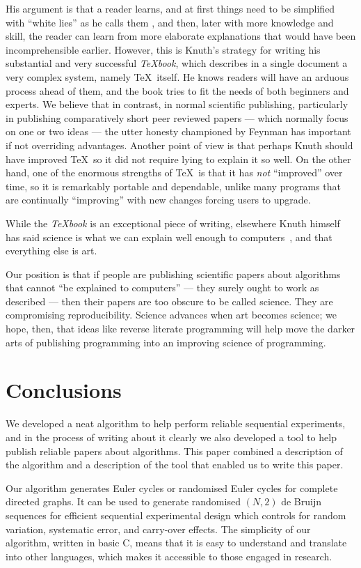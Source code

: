 \documentclass[12pt]{article}
\begin{document}
His argument is that a reader learns, and at first things need to be simplified with ``white lies'' as he calls them \cite[p44]{texbook}, and then, later with more knowledge and skill, the reader can learn from more elaborate explanations that would have been incomprehensible earlier. However, this is Knuth's strategy for writing his substantial and very successful \emph{\TeX book}, which describes in a single document a very complex system, namely \TeX\ itself. He knows readers will have an arduous process ahead of them, and the book tries to fit the needs of both beginners and experts. We believe that in contrast, in normal scientific publishing, particularly in publishing comparatively short peer reviewed papers --- which normally focus on one or two ideas --- the utter honesty championed by Feynman has important if not overriding advantages. Another point of view is that perhaps Knuth should have improved \TeX\ so it did not require lying to explain it so well. On the other hand, one of the enormous strengths of \TeX\ is that it has \emph{not\/} ``improved'' over time, so it is remarkably portable and dependable, unlike many programs that are continually ``improving'' with new changes forcing users to upgrade.

While the \emph{\TeX book} is an exceptional piece of writing, elsewhere Knuth himself has said science is what we can explain well enough to computers~\cite{a=b}, and that everything else is art. 

Our position is that if people are publishing scientific papers about algorithms that cannot ``be explained to computers'' --- they surely ought to work as described --- then their papers are too obscure to be called science. They are compromising reproducibility. Science advances when art becomes science; we hope, then, that ideas like reverse literate programming will help move the darker arts of publishing programming into an improving science of programming.

\section{Conclusions}
We developed a neat algorithm to help perform reliable sequential experiments, and in the process of writing about it clearly we also developed a tool to help publish reliable papers about algorithms. This paper combined a description of the algorithm and a description of the tool that enabled us to write this paper.

Our algorithm generates Euler cycles or randomised Euler cycles for complete directed graphs. It can be used to generate randomised $(N,2)$ de Bruijn sequences for efficient sequential experimental design which controls for random variation, systematic error, and carry-over effects. The simplicity of our algorithm, written in basic C, means that it is easy to understand and translate into other languages, which makes it accessible to those engaged in research. 
\end{document}
